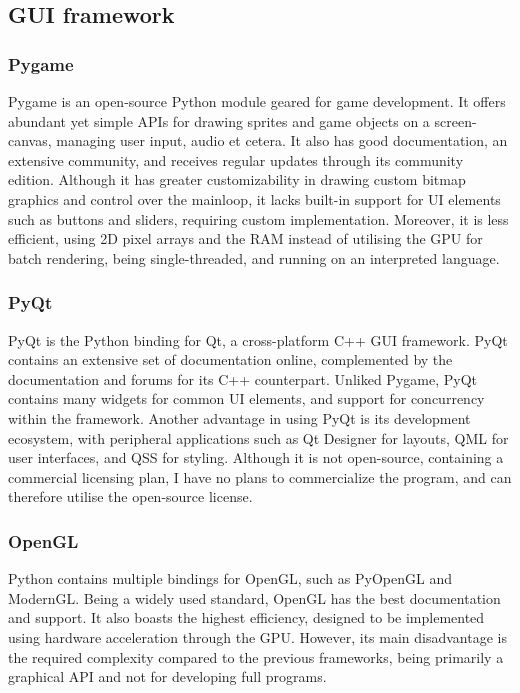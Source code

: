\documentclass[../main/main.tex]{subfiles}
\begin{document}
\subsection{GUI framework}
\subsubsection*{Pygame}
Pygame is an open-source Python module geared for game development. It offers abundant yet simple APIs for drawing sprites and game objects on a screen-canvas, managing user input, audio et cetera. It also has good documentation, an extensive community, and receives regular updates through its community edition. Although it has greater customizability in drawing custom bitmap graphics and control over the mainloop, it lacks built-in support for UI elements such as buttons and sliders, requiring custom implementation. Moreover, it is less efficient, using 2D pixel arrays and the RAM instead of utilising the GPU for batch rendering, being single-threaded, and running on an interpreted language.

\subsubsection*{PyQt}
PyQt is the Python binding for Qt, a cross-platform C++ GUI framework. PyQt contains an extensive set of documentation online, complemented by the documentation and forums for its C++ counterpart. Unliked Pygame, PyQt contains many widgets for common UI elements, and support for concurrency within the framework. Another advantage in using PyQt is its development ecosystem, with peripheral applications such as Qt Designer for layouts, QML for user interfaces, and QSS for styling. Although it is not open-source, containing a commercial licensing plan, I have no plans to commercialize the program, and can therefore utilise the open-source license.

\subsubsection*{OpenGL}
Python contains multiple bindings for OpenGL, such as PyOpenGL and ModernGL. Being a widely used standard, OpenGL has the best documentation and support. It also boasts the highest efficiency, designed to be implemented using hardware acceleration through the GPU. However, its main disadvantage is the required complexity compared to the previous frameworks, being primarily a graphical API and not for developing full programs.
\end{document}
